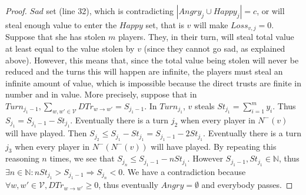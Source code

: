 \documentclass[11pt]{article}
\theoremstyle{definition}
\theoremstyle{corollary}
\theoremstyle{lemma}
\begin{document}
\begin{proof}
       $Sad$ set (line 32), which is contradicting $|Angry_j \cup Happy_j| = c$, or will steal enough value to enter the
       $Happy$ set, that is $v$ will make $Loss_{v, j} = 0$. Suppose that she has stolen $m$ players. They, in their turn,
       will steal total value at least equal to the value stolen by $v$ (since they cannot go sad, as explained above).
       However, this means that, since the total value being stolen will never be reduced and the turns this will happen are
       infinite, the players must steal an infinite amount of value, which is impossible because the direct trusts are finite
       in number and in value. More precisely, suppose that in $Turn_{j_1-1}, \sum\limits_{w,w' \in \mathcal{V}}DTr_{w
       \rightarrow w'} = S_{j_1-1}$. In $Turn_{j_1}$, $v$ steals $St_{j_1} = \sum\limits_{i=1}^{m}y_i$. Thus $S_{j_1} =
       S_{j_1-1} - St_{j_1}$. Eventually there is a turn $j_2$ when every player in $N^{-}(v)$ will have played. Then
       $S_{j_2} \leq S_{j_1} - St_{j_1} = S_{j_1-1} - 2St_{j_1}$. Eventually there is a turn $j_3$ when every player in
       $N^{-}(N^{-}(v))$ will have played. By repeating this reasoning $n$ times, we see that $S_{j_n} \leq S_{j_1-1} -
       nSt_{j_1}$. However $S_{j_1-1}, St_{j_1} \in \mathbb{N}$, thus $\exists n \in \mathbb{N} : nSt_{j_1} > S_{j_1-1}
       \Rightarrow S_{j_n} < 0$. We have a contradiction because $\forall w,w' \in \mathcal{V}, DTr_{w \rightarrow w'}
       \geq 0$, thus eventually $Angry = \emptyset$ and everybody passes.
    \end{proof}
\end{document}

